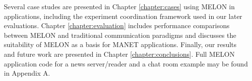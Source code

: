 Several case studes are presented in Chapter \ref{chapter:cases} using MELON in applications, including the experiment coordination framework used in our later evaluations. Chapter \ref{chapter:evaluation} includes performance comparisons between MELON and traditional communication paradigms and discusses the suitability of MELON as a basis for MANET applications. Finally, our results and future work are presented in Chapter \ref{chapter:conclusions}. Full MELON application code for a news server/reader and a chat room example may be found in Appendix A.